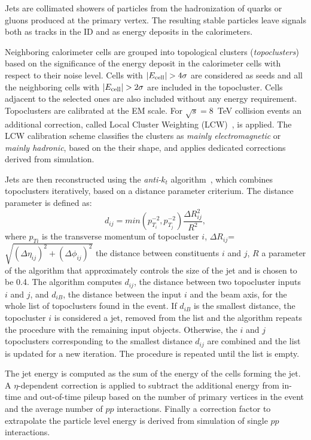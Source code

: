 Jets are collimated showers of particles from the hadronization of
quarks or gluons produced at the primary vertex.
The resulting stable particles leave signals both as tracks in the ID
and as energy deposits in the calorimeters.

Neighboring calorimeter cells are grouped into topological clusters
({\it topoclusters}) based on the significance of the energy deposit
in the calorimeter cells with respect to their noise
level. Cells with $|E_{\rm cell}|>4\sigma$ are considered as seeds and
all the neighboring cells with $|E_{\rm cell}| > 2\sigma$ are included
in the topocluster. Cells adjacent to the selected ones are also
included without any energy requirement.
Topoclusters are calibrated at the EM scale. For $\sqrt{s} = $8~TeV
collision events an additional correction, called Local Cluster
Weighting (LCW)~\cite{lcwcalib}, is applied. The LCW calibration
scheme classifies the clusters as {\it mainly electromagnetic} or
{\it mainly hadronic}, based on the their shape, and applies
dedicated corrections derived from simulation.

Jets are then reconstructed using the {\it anti-$k_t$}
algorithm~\cite{antiktalgo}, which combines topoclusters iteratively,
based on a distance parameter criterium. The distance parameter is
defined as:
\begin{equation}
d_{ij}=min(p_{T_i}^{-2},p_{T_j}^{-2})\frac{\Delta R_{ij}^{2}}{R^{2}},
\end{equation}
where $p_{Ti}$ is the transverse momentum of topocluster $i$, 
$\Delta R_{ij}$=$\sqrt{(\Delta\eta_{ij})^{2}+(\Delta\phi_{ij})^{2}}$ the distance 
between constituents $i$ and
$j$, $R$ a parameter of the algorithm that approximately controls the size
of the jet and is chosen to be 0.4.
The algorithm computes $d_{ij}$, the distance between two topocluster
inputs $i$ and $j$, and $d_{iB}$,  the distance between the input $i$
and the beam axis, for the whole list of topoclusters found in the
event. If $d_{iB}$ is the smallest distance, the
topocluster $i$ is considered a jet, removed from the list and the
algorithm repeats the procedure with the remaining input objects.
Otherwise, the $i$ and $j$ topoclusters corresponding to the smallest
distance $d_{ij}$ are combined and the list is updated for a new
iteration.
The procedure is repeated until the list is empty.

The jet energy is computed as the sum of the energy of the cells
forming the jet.
A $\eta$-dependent correction is applied to subtract the additional
energy from in-time and out-of-time pileup based on the number of
primary vertices in the event and the average number of $pp$
interactions.
Finally a correction factor to extrapolate the particle level energy
is derived from simulation of single $pp$ interactions.

